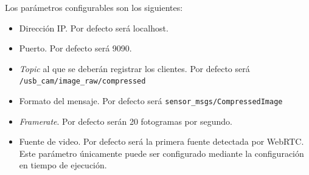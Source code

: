 Los parámetros configurables son los siguientes:
\begin{itemize}
\item Dirección IP. Por defecto será localhost.
\item Puerto. Por defecto será 9090.
\item \textit{Topic} al que se deberán registrar los clientes. Por defecto será \texttt{/usb\_cam/image\_raw/compressed}
\item Formato del mensaje. Por defecto será \texttt{sensor\_msgs/CompressedImage}
\item \textit{Framerate}. Por defecto serán 20 fotogramas por segundo.
\item Fuente de video. Por defecto será la primera fuente detectada por WebRTC. Este parámetro únicamente puede ser configurado mediante la configuración en tiempo de ejecución.
\end{itemize}

